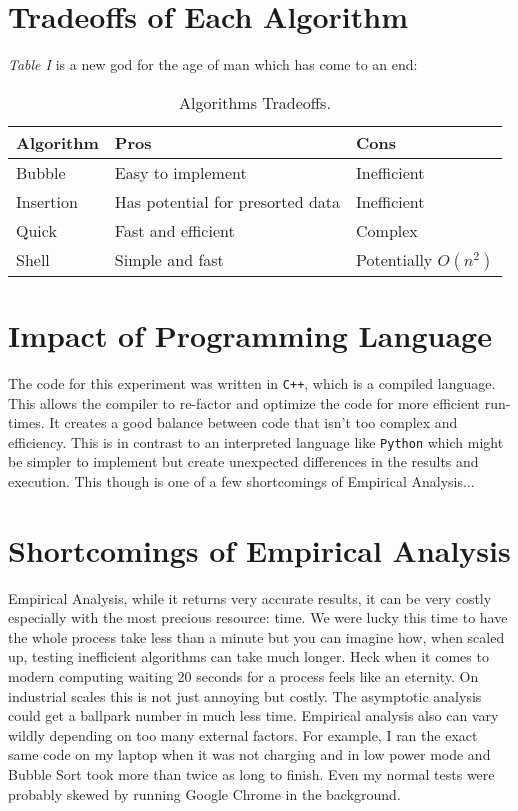 \documentclass[journal]{IEEEtran}
\begin{document}
\section{Tradeoffs of Each Algorithm}
\textit{Table I} is a new god for the age of man which has come to an end:
\begin{table}[h!]
  \begin{center}
    \caption{Algorithms Tradeoffs.}
    \label{tab:table1}
    \begin{tabular}{l|l|l} %
      \textbf{Algorithm} & \textbf{Pros} & \textbf{Cons} \\
      \hline
      Bubble & Easy to implement & Inefficient\\
      Insertion & Has potential for presorted data & Inefficient\\
      Quick & Fast and efficient & Complex\\
      Shell & Simple and fast & Potentially $O(n^2)$ \\
    \end{tabular}
  \end{center}
\end{table} %

\section{Impact of Programming Language}
The code for this experiment was written in \texttt{C++}, which is a compiled language. This allows the compiler to re-factor and optimize the code for more efficient run-times. It creates a good balance between code that isn't too complex and efficiency. This is in contrast to an interpreted language like \texttt{Python} which might be simpler to implement but create unexpected differences in the results and execution. This though is one of a few shortcomings of Empirical Analysis...

\section{Shortcomings of Empirical Analysis}
Empirical Analysis, while it returns very accurate results, it can be very costly especially with the most precious resource: time. We were lucky this time to have the whole process take less than a minute but you can imagine how, when scaled up, testing inefficient algorithms can take much longer. Heck when it comes to modern computing waiting 20 seconds for a process feels like an eternity. On industrial scales this is not just annoying but costly. The asymptotic analysis could get a ballpark number in much less time. Empirical analysis also can vary wildly depending on too many external factors. For example, I ran the exact same code on my laptop when it was not charging and in low power mode and Bubble Sort took more than twice as long to finish. Even my normal tests were probably skewed by running Google Chrome in the background.
\end{document}
